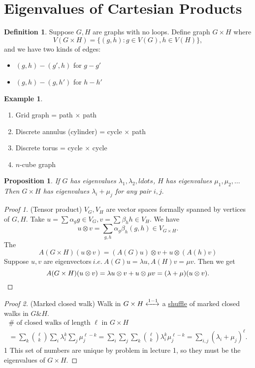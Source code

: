 \documentclass{report}
\newcommand{\ie}{\ i.e.\ }
\newtheorem{proposition}{Proposition}[section]
\theoremstyle{definition}
\newtheorem{definition}{Definition}[section]
\newtheorem{example}{Example}[section]
\theoremstyle{remark}
\numberwithin{equation}{section}
\begin{document}
\section{Eigenvalues of Cartesian Products}
\begin{definition}
Suppose $G, H$ are graphs with no loops. Define graph $G \times H$ where \[V(G \times H) = \{(g, h) : g \in V(G), h \in V(H)\},\]
and we have two kinds of edges:
\begin{itemize}
\item $(g, h) - (g', h)$ for $g - g'$
\item $(g, h) - (g, h')$ for $h - h'$
\end{itemize}
\end{definition}
\begin{example}
\begin{enumerate}
\item Grid graph = path $\times$ path
\item Discrete annulus
(cylinder) = cycle $\times$ path
\item Discrete torus = cycle $\times$ cycle
\item $n$-cube graph
\end{enumerate}
\end{example}
\begin{proposition}
If $G$ has eigenvalues $\lambda_1, \lambda_2, ldots$, $H$ has eigenvalues $\mu_1, \mu_2, \ldots$ Then $G \times H$ has eigenvalues $\lambda_i + \mu_j$ for any pair $i, j.$
\end{proposition}
\begin{proof}[Proof 1](Tensor product)
$V_G, V_H$ are vector spaces formally spanned by vertices of $G, H.$ Take $u = \sum \alpha_g g \in V_G, v = \sum \beta_h h \in V_H.$ We have
\[u \otimes v = \sum_{g, h} \alpha_g\beta_h(g, h) \in V_{G \times H}.\]
The 
\[
A(G \times H)(u \otimes v) = (A(G)u) \otimes v + u \otimes (A(h)v)
\]
Suppose $u, v$ are eigenvectors$\ie A(G)u = \lambda u, A(H)v = \mu v.$ Then we get
\[
A(G \times H)(u \otimes v) = \lambda u \otimes v + u \otimes \mu v = (\lambda+\mu)(u \otimes v). \qedhere
\]
\end{proof}

\begin{proof}[Proof 2](Marked closed walk)
Walk in $G \times H \xleftrightarrow[]{1-1}$ a \underline{shuffle} of marked closed walks in $G \& H.$
\begin{multline*}
\# \text{ of closed walks of length $\ell$ in $G \times H$} \\
= \sum_{k} \binom{\ell}{k} \sum_i \lambda_i^k\sum_j \mu_j^{\ell - k}
= \sum_i \sum_j \sum_k \binom{\ell}{k} \lambda_i^{k} \mu_j^{\ell - k}
= \sum_{i, j} (\lambda_i + \mu_j)^\ell.
\end{multline*}1
This set of numbers are unique by problem in lecture 1, so they must be the eigenvalues of $G \times H.$
\end{proof}
\end{document}

